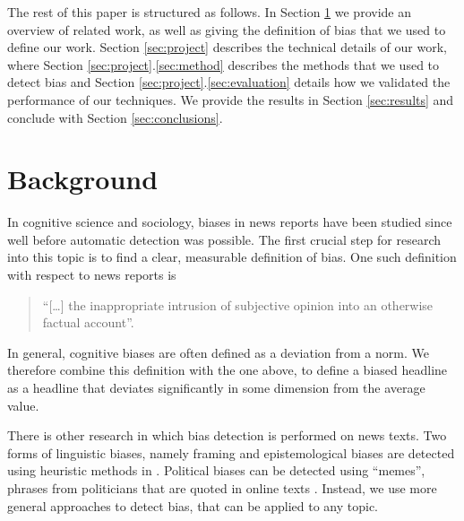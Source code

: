 \documentclass[final]{ieee}
\begin{document}
The rest of this paper is structured as follows. In Section \ref{sec:background} we provide an overview of related work, as well as giving the definition of bias that we used to define our work. Section \ref{sec:project} describes the technical details of our work, where Section \ref{sec:project}.\ref{sec:method} describes the methods that we used to detect bias and Section \ref{sec:project}.\ref{sec:evaluation} details how we validated the performance of our techniques. We provide the results in Section \ref{sec:results} and conclude with Section \ref{sec:conclusions}. 

     

            
            
\section{Background}\label{sec:background}

In cognitive science and sociology, biases in news reports have been studied since well before automatic detection was possible. The first crucial step for research into this topic is to find a clear, measurable definition of bias. One such definition with respect to news reports is \begin{quotation}
``[\dots] the inappropriate intrusion of subjective opinion into an otherwise factual account''.\cite{STOCKING89}
\end{quotation}
In general, cognitive biases are often defined as a deviation from a norm. We therefore combine this definition with the one above, to define a biased headline as a headline that deviates significantly in some dimension from the average value.
  
There is other research in which bias detection is performed on news texts. Two forms of linguistic biases, namely framing and epistemological biases are detected using heuristic methods in \cite{RECASENS13}. Political biases can be detected using ``memes'', phrases from politicians that are quoted in online texts \cite{GUPTA09}. Instead, we use more general approaches to detect bias, that can be applied to any topic.
\end{document}
